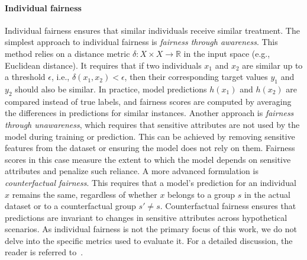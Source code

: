 \paragraph{Individual fairness}\label{par:individual-fairness}
%
Individual fairness ensures that similar individuals receive similar treatment.
%
The simplest approach to individual fairness is \emph{fairness through awareness}.
%
This method relies on a distance metric \(\delta : X \times X \to \mathbb{R}\) in the input space (e.g., Euclidean distance).
%
It requires that if two individuals \(x_1\) and \(x_2\) are similar up to a threshold \(\epsilon\), i.e., \(\delta(x_1, x_2) < \epsilon\), then their corresponding target values \(y_1\) and \(y_2\) should also be similar.
%
In practice, model predictions \(h(x_1)\) and \(h(x_2)\) are compared instead of true labels, and fairness scores are computed by averaging the differences in predictions for similar instances.
%
Another approach is \emph{fairness through unawareness}, which requires that sensitive attributes are not used by the model during training or prediction.
%
This can be achieved by removing sensitive features from the dataset or ensuring the model does not rely on them.
%
Fairness scores in this case measure the extent to which the model depends on sensitive attributes and penalize such reliance.
%
A more advanced formulation is \emph{counterfactual fairness}.
%
This requires that a model's prediction for an individual \(x\) remains the same, regardless of whether \(x\) belongs to a group \(s\) in the actual dataset or to a counterfactual group \(s' \neq s\).
%
Counterfactual fairness ensures that predictions are invariant to changes in sensitive attributes across hypothetical scenarios.
%
As individual fairness is not the primary focus of this work, we do not delve into the specific metrics used to evaluate it.
%
For a detailed discussion, the reader is referred to~\cite{DBLP:journals/csur/MehrabiMSLG21}.
